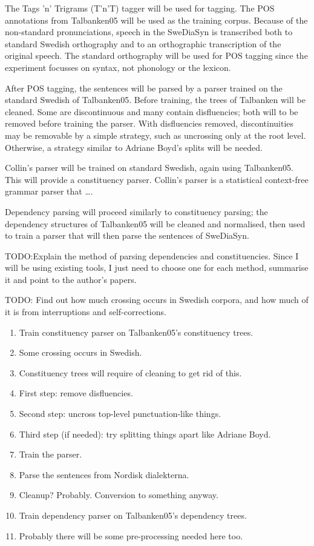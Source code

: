 \documentclass[11pt]{article}
\begin{document}
The Tags 'n' Trigrams (T'n'T) tagger will be used for tagging. The POS
annotations from Talbanken05 will be used as the training
corpus. Because of the non-standard pronunciations, speech in the
SweDiaSyn is transcribed both to standard Swedish orthography and to an
orthographic transcription of the original speech. The standard
orthography will be used for POS tagging since the experiment focusses
on syntax, not phonology or the lexicon.

After POS tagging, the sentences will be parsed by a parser trained
on the standard Swedish of Talbanken05. Before training, the trees of
Talbanken will be cleaned. Some are discontinuous and many contain
disfluencies; both will to be removed before training the parser. With
disfluencies removed, discontinuities may be removable by a simple
strategy, such as uncrossing only at the root level. Otherwise, a
strategy similar to Adriane Boyd's splits will be needed.

Collin's parser will be trained on standard
Swedish, again using Talbanken05. This will provide a constituency
parser. Collin's parser is a statistical context-free grammar parser
that \ldots.

Dependency parsing will proceed similarly to constituency parsing;
the dependency structures of Talbanken05 will be cleaned and
normalised, then used to train a parser that will then parse the
sentences of SweDiaSyn.

TODO:Explain the method of parsing dependencies and
constituencies. Since I will be using existing tools, I just need to
choose one for each method, summarise it and point to the author's
papers.

TODO: Find out how much crossing occurs in Swedish corpora, and how
much of it is from interruptions and self-corrections.

\begin{enumerate}
\item Train constituency parser on Talbanken05's constituency trees.
\item Some crossing occurs in Swedish.
\item Constituency trees will require of cleaning to get rid of this.
\item First step: remove disfluencies.
\item Second step: uncross top-level punctuation-like things.
\item Third step (if needed): try splitting things apart like Adriane Boyd.
\item Train the parser.
\item Parse the sentences from Nordisk dialekterna.
\item Cleanup? Probably. Conversion to something anyway.
\item Train dependency parser on Talbanken05's dependency trees.
\item Probably there will be some pre-processing needed here too.
\end{enumerate}
\end{document}
